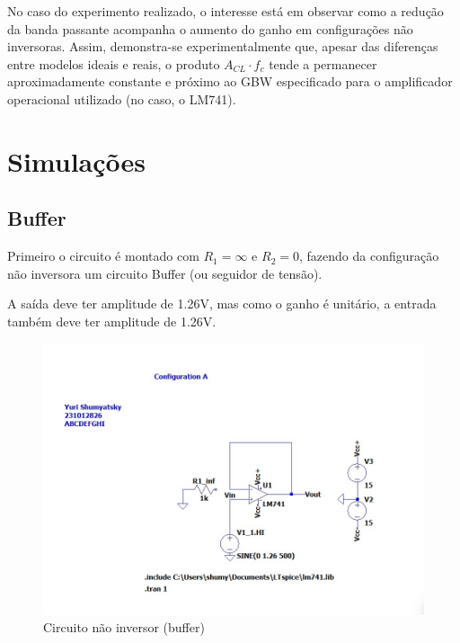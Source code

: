 \documentclass[10pt,twocolumn,letterpaper]{article}
\begin{document}
No caso do experimento realizado, o interesse está em observar como a redução da banda passante acompanha o aumento do ganho em configurações não inversoras. Assim, demonstra-se experimentalmente que, apesar das diferenças entre modelos ideais e reais, o produto $A_{CL} \cdot f_c$ tende a permanecer aproximadamente constante e próximo ao GBW especificado para o amplificador operacional utilizado (no caso, o LM741).






\section{Simulações}

\subsection{Buffer}

Primeiro o circuito é montado com $R_1=\infty$ e $R_2=0$, fazendo da configuração não inversora um circuito Buffer (ou seguidor de tensão).

A saída deve ter amplitude de 1.26V, mas como o ganho é unitário, a entrada também deve ter amplitude de 1.26V.

\begin{figure}[h]
\caption{Circuito não inversor (buffer)}
\begin{center}
\includegraphics[scale=0.25]{figuras/fig1}
\end{center}
\end{figure}
\newpage
\end{document}

